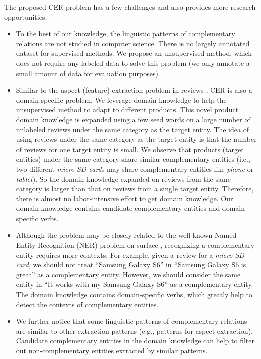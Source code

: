 The proposed CER problem has a few challenges and also provides more research opportunities:
\begin{itemize}
    \item To the best of our knowledge, the linguistic patterns of complementary relations are not studied in computer science. There is no largely annotated dataset for supervised methods. We propose an unsupervised method, which does not require any labeled data to solve this problem (we only annotate a small amount of data for evaluation purposes).
    \item Similar to the aspect (feature) extraction problem in reviews \cite{liu2015sentiment}, CER is also a domain-specific problem. We leverage domain knowledge to help the unsupervised method to adapt to different products. This novel product domain knowledge is expanded using a few seed words on a large number of unlabeled reviews under the same category as the target entity. The idea of using reviews under the same category as the target entity is that the number of reviews for one target entity is small. We observe that products (target entities) under the same category share similar complementary entities (i.e., two different \textit{micro SD card}s may share complementary entities like \textit{phone} or \textit{tablet}). So the domain knowledge expanded on reviews from the same category is larger than that on reviews from a single target entity. Therefore, there is almost no labor-intensive effort to get domain knowledge. Our domain knowledge contains candidate complementary entities and domain-specific verbs.
    \item Although the problem may be closely related to the well-known Named Entity Recognition (NER) problem on surface \cite{nadeau2007survey}, recognizing a complementary entity requires more contexts. For example, given a review for a \textit{micro SD card}, we should not treat ``Samsung Galaxy S6'' in ``Samsung Galaxy S6 is great'' as a complementary entity. However, we should consider the same entity in ``It works with my Samsung Galaxy S6'' as a complementary entity. The domain knowledge contains domain-specific verbs, which greatly help to detect the contexts of complementary entities.
    \item We further notice that some linguistic patterns of complementary relations are similar to other extraction patterns (e.g., patterns for aspect extraction). Candidate complementary entities in the domain knowledge can help to filter out non-complementary entities extracted by similar patterns.
\end{itemize}

